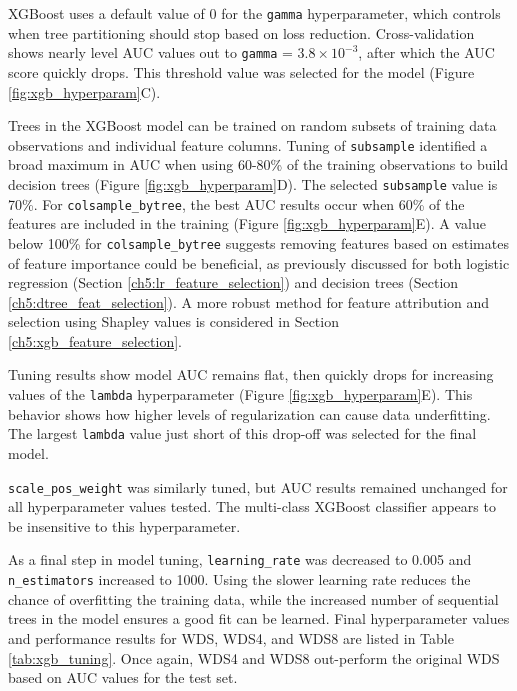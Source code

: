 XGBoost uses a default value of 0 for the \verb|gamma| hyperparameter, which controls when tree partitioning should stop based on loss reduction. Cross-validation shows nearly level AUC values out to \verb|gamma| = $3.8\times10^{-3}$, after which the AUC score quickly drops. This threshold value was selected for the model (Figure \ref{fig:xgb_hyperparam}C).

Trees in the XGBoost model can be trained on random subsets of training data observations and individual feature columns. Tuning of \verb|subsample| identified a broad maximum in AUC when using 60-80\% of the training observations to build decision trees (Figure \ref{fig:xgb_hyperparam}D). The selected \verb|subsample| value is 70\%. For \verb|colsample_bytree|, the best AUC results occur when 60\% of the features are included in the training (Figure \ref{fig:xgb_hyperparam}E). A value below 100\% for \verb|colsample_bytree| suggests removing features based on estimates of feature importance could be beneficial, as previously discussed for both logistic regression (Section \ref{ch5:lr_feature_selection}) and decision trees (Section \ref{ch5:dtree_feat_selection}). A more robust method for feature attribution and selection using Shapley values is considered in Section \ref{ch5:xgb_feature_selection}.

Tuning results show model AUC remains flat, then quickly drops for increasing values of the \verb|lambda| hyperparameter (Figure \ref{fig:xgb_hyperparam}E). This behavior shows how higher levels of regularization can cause data underfitting. The largest \verb|lambda| value just short of this drop-off was selected for the final model.

\verb|scale_pos_weight| was similarly tuned, but AUC results remained unchanged for all hyperparameter values tested. The multi-class XGBoost classifier appears to be insensitive to this hyperparameter.

As a final step in model tuning, \verb|learning_rate| was decreased to 0.005 and \verb|n_estimators| increased to 1000.  Using the slower learning rate reduces the chance of overfitting the training data, while the increased number of sequential trees in the model ensures a good fit can be learned. 
Final hyperparameter values and performance results for WDS, WDS4, and WDS8 are listed in Table \ref{tab:xgb_tuning}. Once again, WDS4 and WDS8 out-perform the original WDS based on AUC values for the test set.

